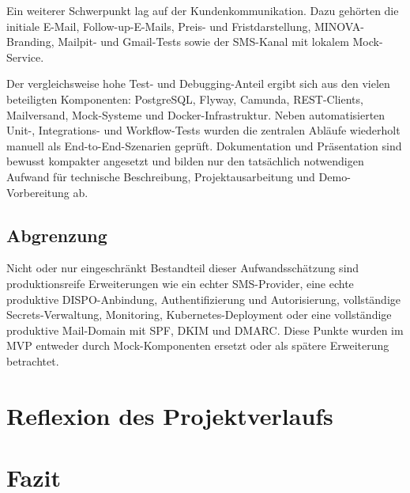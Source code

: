 \documentclass[
12pt,
a4paper,
oneside
]{article}
\begin{document}
Ein weiterer Schwerpunkt lag auf der Kundenkommunikation. Dazu geh\"orten die initiale E-Mail, Follow-up-E-Mails, Preis- und Fristdarstellung, MINOVA-Branding, Mailpit- und Gmail-Tests sowie der SMS-Kanal mit lokalem Mock-Service.

Der vergleichsweise hohe Test- und Debugging-Anteil ergibt sich aus den vielen beteiligten Komponenten: PostgreSQL, Flyway, Camunda, REST-Clients, Mailversand, Mock-Systeme und Docker-Infrastruktur. Neben automatisierten Unit-, Integrations- und Workflow-Tests wurden die zentralen Abl\"aufe wiederholt manuell als End-to-End-Szenarien gepr\"uft. Dokumentation und Pr\"asentation sind bewusst kompakter angesetzt und bilden nur den tats\"achlich notwendigen Aufwand f\"ur technische Beschreibung, Projektausarbeitung und Demo-Vorbereitung ab.

\subsection{Abgrenzung}

Nicht oder nur eingeschränkt Bestandteil dieser Aufwandsschätzung sind produktionsreife Erweiterungen wie ein echter SMS-Provider, eine echte produktive DISPO-Anbindung, Authentifizierung und Autorisierung, vollständige Secrets-Verwaltung, Monitoring, Kubernetes-Deployment oder eine vollständige produktive Mail-Domain mit SPF, DKIM und DMARC. Diese Punkte wurden im MVP entweder durch Mock-Komponenten ersetzt oder als spätere Erweiterung betrachtet.

	
	\section{Reflexion des Projektverlaufs}
	
	
	\section{Fazit}
	
	
\end{document}
